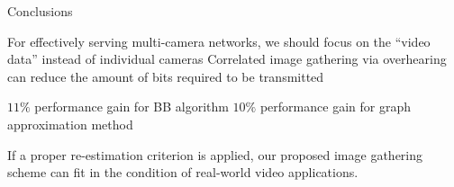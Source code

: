 \begin{frame}{Conclusions}
\begin{itemize}
	\myItem For effectively serving multi-camera networks, we should focus on the ``video data'' instead of individual cameras
	\myItem Correlated image gathering via overhearing can reduce the amount of bits required to be transmitted
	\begin{itemize}
		\mySubItem $11 \%$ performance gain for BB algorithm
		\mySubItem $10 \%$ performance gain for graph approximation method
	\end{itemize}
	\myItem If a proper re-estimation criterion is applied, our proposed image gathering scheme can fit in the condition of real-world video applications.
\end{itemize}
\end{frame}